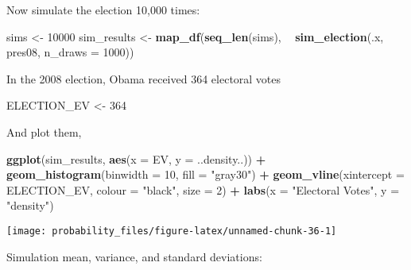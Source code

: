 \documentclass[]{book}
\newenvironment{Shaded}{\begin{snugshade}}{\end{snugshade}}
\newcommand{\KeywordTok}[1]{\textcolor[rgb]{0.13,0.29,0.53}{\textbf{#1}}}
\newcommand{\DataTypeTok}[1]{\textcolor[rgb]{0.13,0.29,0.53}{#1}}
\newcommand{\DecValTok}[1]{\textcolor[rgb]{0.00,0.00,0.81}{#1}}
\newcommand{\StringTok}[1]{\textcolor[rgb]{0.31,0.60,0.02}{#1}}
\newcommand{\CommentTok}[1]{\textcolor[rgb]{0.56,0.35,0.01}{\textit{#1}}}
\newcommand{\OperatorTok}[1]{\textcolor[rgb]{0.81,0.36,0.00}{\textbf{#1}}}
\newcommand{\NormalTok}[1]{#1}
\theoremstyle{definition}
\theoremstyle{definition}
\theoremstyle{definition}
\theoremstyle{remark}
\begin{document}
Now simulate the election 10,000 times:

\begin{Shaded}
\begin{Highlighting}[]
\NormalTok{sims <-}\StringTok{ }\DecValTok{10000}
\NormalTok{sim_results <-}\StringTok{ }\KeywordTok{map_df}\NormalTok{(}\KeywordTok{seq_len}\NormalTok{(sims), }\OperatorTok{~}\StringTok{ }\KeywordTok{sim_election}\NormalTok{(.x, pres08, }\DataTypeTok{n_draws =} \DecValTok{1000}\NormalTok{))}
\end{Highlighting}
\end{Shaded}

In the 2008 election, Obama received 364 electoral votes

\begin{Shaded}
\begin{Highlighting}[]
\NormalTok{ELECTION_EV <-}\StringTok{ }\DecValTok{364}
\end{Highlighting}
\end{Shaded}

And plot them,

\begin{Shaded}
\begin{Highlighting}[]
\KeywordTok{ggplot}\NormalTok{(sim_results, }\KeywordTok{aes}\NormalTok{(}\DataTypeTok{x =}\NormalTok{ EV, }\DataTypeTok{y =}\NormalTok{ ..density..)) }\OperatorTok{+}
\StringTok{  }\KeywordTok{geom_histogram}\NormalTok{(}\DataTypeTok{binwidth =} \DecValTok{10}\NormalTok{, }\DataTypeTok{fill =} \StringTok{"gray30"}\NormalTok{) }\OperatorTok{+}
\StringTok{  }\KeywordTok{geom_vline}\NormalTok{(}\DataTypeTok{xintercept =}\NormalTok{ ELECTION_EV, }\DataTypeTok{colour =} \StringTok{"black"}\NormalTok{, }\DataTypeTok{size =} \DecValTok{2}\NormalTok{) }\OperatorTok{+}
\StringTok{  }\KeywordTok{labs}\NormalTok{(}\DataTypeTok{x =} \StringTok{"Electoral Votes"}\NormalTok{, }\DataTypeTok{y =} \StringTok{"density"}\NormalTok{)}
\end{Highlighting}
\end{Shaded}

\begin{center}\texttt{[image: probability\_files/figure-latex/unnamed-chunk-36-1]} \end{center}

Simulation mean, variance, and standard deviations:

\begin{Shaded}
\end{Shaded}
\end{document}
